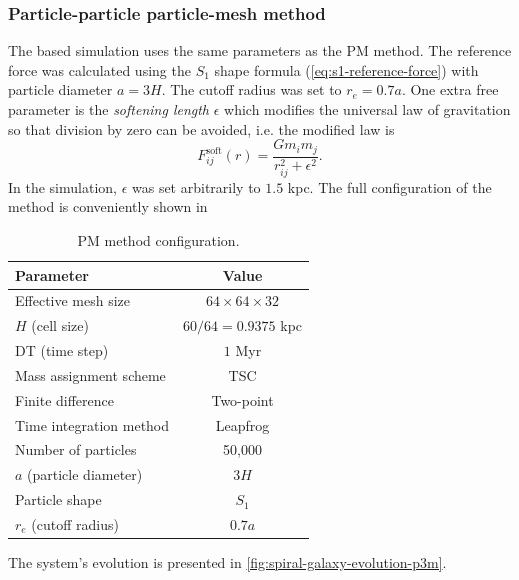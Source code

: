 \subsubsection{Particle-particle particle-mesh method}
The \PThreeM{} based simulation uses the same parameters as the PM method.
The reference force was calculated using the $S_1$ shape formula (\autoref{eq:s1-reference-force}) with particle diameter $a=3H$.
The cutoff radius was set to $r_e=0.7a$.
One extra free parameter is the \textit{softening length} $\epsilon$ which modifies the universal law of gravitation so that division by zero can be avoided, i.e. the modified law is
\begin{equation*}
    F^\text{soft}_{ij}(r) = \frac{G m_i m_j}{r_{ij}^2 + \epsilon^2}.
\end{equation*}
In the simulation, $\epsilon$ was set arbitrarily to $1.5$ kpc.
The full configuration of the \PThreeM{} method is conveniently shown in
\begin{table}[htp]
    \centering
    \begin{tabular}{|l|c|}
        \hline
        \textbf{Parameter}      & \textbf{Value}           \\
        \hline
        Effective mesh size     & $64 \times 64 \times 32$ \\
        $H$ (cell size)         & $60/64=0.9375$ kpc       \\
        DT (time step)          & $1$ Myr                  \\
        Mass assignment scheme  & TSC                      \\
        Finite difference       & Two-point                \\
        Time integration method & Leapfrog                 \\
        Number of particles     & 50,000                   \\
        $a$ (particle diameter) & $3H$                     \\
        Particle shape          & $S_1$                    \\
        $r_e$ (cutoff radius)   & $0.7a$                   \\
        \hline
    \end{tabular}
    \caption{PM method configuration.}
    \label{tab:p3m-method-parameters}
\end{table}
The system's evolution is presented in \autoref{fig:spiral-galaxy-evolution-p3m}.
